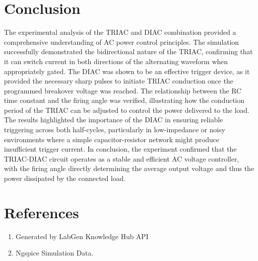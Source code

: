 \documentclass[12pt,a4paper]{article}
\begin{document}
\section{Conclusion}
The experimental analysis of the TRIAC and DIAC combination provided a comprehensive understanding of AC power control principles. The simulation successfully demonstrated the bidirectional nature of the TRIAC, confirming that it can switch current in both directions of the alternating waveform when appropriately gated. The DIAC was shown to be an effective trigger device, as it provided the necessary sharp pulses to initiate TRIAC conduction once the programmed breakover voltage was reached. The relationship between the RC time constant and the firing angle was verified, illustrating how the conduction period of the TRIAC can be adjusted to control the power delivered to the load. The results highlighted the importance of the DIAC in ensuring reliable triggering across both half-cycles, particularly in low-impedance or noisy environments where a simple capacitor-resistor network might produce insufficient trigger current. In conclusion, the experiment confirmed that the TRIAC-DIAC circuit operates as a stable and efficient AC voltage controller, with the firing angle directly determining the average output voltage and thus the power dissipated by the connected load.

\section{References}
\begin{enumerate}

    \item Generated by LabGen Knowledge Hub API

    \item Ngspice Simulation Data.

\end{enumerate}
\end{document}
